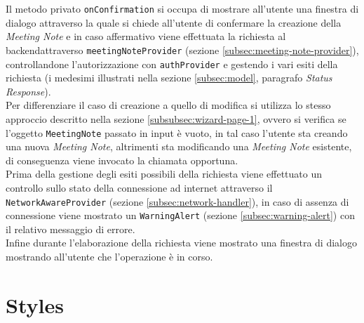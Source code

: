 Il metodo privato \lstinline{onConfirmation} si occupa di mostrare all'utente una finestra di dialogo attraverso la quale si chiede all'utente di confermare la creazione della \emph{Meeting Note} e in caso affermativo viene effettuata la richiesta al \gls{backend}\glsoccur attraverso \lstinline{meetingNoteProvider} (sezione \ref{subsec:meeting-note-provider}), controllandone l'autorizzazione con \lstinline{authProvider} e gestendo i vari esiti della richiesta (i medesimi illustrati nella sezione \ref{subsec:model},  paragrafo \emph{Status Response}). \\
Per differenziare il caso di creazione a quello di modifica si utilizza lo stesso approccio descritto nella sezione \ref{subsubsec:wizard-page-1}, ovvero si verifica se l'oggetto \lstinline{MeetingNote} passato in input è vuoto, in tal caso l'utente sta creando una nuova \emph{Meeting Note}, altrimenti sta modificando una \emph{Meeting Note} esistente, di conseguenza viene invocato la chiamata opportuna. \\
Prima della gestione degli esiti possibili della richiesta viene effettuato un controllo sullo stato della connessione ad internet attraverso il \lstinline{NetworkAwareProvider} (sezione \ref{subsec:network-handler}), in caso di assenza di connessione viene mostrato un \lstinline{WarningAlert} (sezione \ref{subsec:warning-alert}) con il relativo messaggio di errore. \\
Infine durante l'elaborazione della richiesta viene mostrato una finestra di dialogo mostrando all'utente che l'operazione è in corso.

\section{Styles}
\label{sec:styles}


